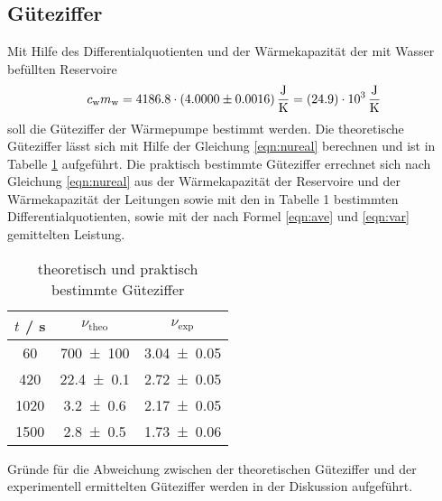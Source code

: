\subsection{Güteziffer}
Mit Hilfe des Differentialquotienten und der Wärmekapazität der mit Wasser befüllten Reservoire
\begin{equation}
  c_\text{w} m_\text{w} = 4186.8 \cdot (\num{4 +- 0.0016}) \, \frac{\text{J}}{\text{K}} = (\num{24.9 +- 0.0}) \cdot 10^3 \, \frac{\text{J}}{\text{K}}
  \label{eqn:WC}
\end{equation}
soll die Güteziffer der Wärmepumpe bestimmt werden. Die theoretische Güteziffer lässt sich mit Hilfe der Gleichung \ref{eqn:nureal} berechnen und ist in Tabelle \ref{tab:gueteziffer} aufgeführt. Die praktisch bestimmte Güteziffer errechnet sich nach Gleichung \ref{eqn:nureal} aus der Wärmekapazität der Reservoire und der Wärmekapazität der Leitungen sowie mit den in Tabelle 1 bestimmten Differentialquotienten, sowie mit der nach Formel \ref{eqn:ave} und \ref{eqn:var} gemittelten Leistung.
\begin{table}
  \centering
  \begin{tabular}{c c c}
    \toprule
    $t$ / s & $\nu_\text{theo}$ & $\nu_\text{exp}$ \\
    \midrule
    60	 & \num{700 +-100} 	& \num{3.04 +- 0.05} 	\\
    420  & \num{22.4 +- 0.1}	& \num{2.72 +- 0.05} 	\\
    1020 & \num{3.2 +- 0.6}	& \num{2.17 +- 0.05}	\\
    1500 & \num{2.8 +- 0.5}	& \num{1.73 +- 0.06} 	\\
    \bottomrule
  \end{tabular}
  \caption{theoretisch und praktisch bestimmte Güteziffer}
  \label{tab:gueteziffer}
\end{table}
Gründe für die Abweichung zwischen der theoretischen Güteziffer und der experimentell ermittelten Güteziffer werden in der Diskussion aufgeführt.
